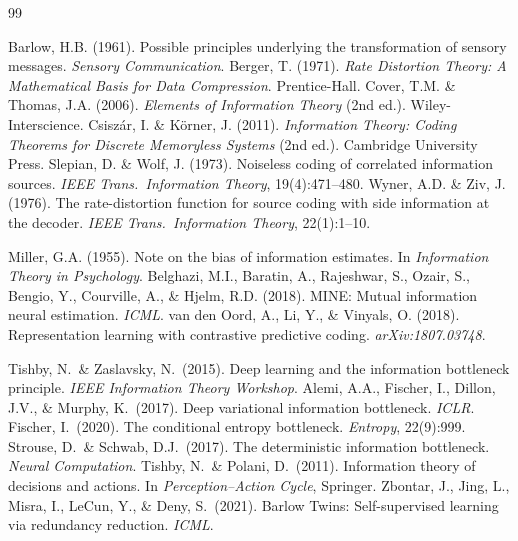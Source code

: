 \documentclass[10pt, letterpaper]{article}
\begin{document}
\begin{thebibliography}{99}

 Barlow, H.B. (1961). Possible principles underlying the transformation of sensory messages. \emph{Sensory Communication}.
 Berger, T. (1971). \emph{Rate Distortion Theory: A Mathematical Basis for Data Compression}. Prentice-Hall.
 Cover, T.M. \& Thomas, J.A. (2006). \emph{Elements of Information Theory} (2nd ed.). Wiley-Interscience.
 Csisz\'ar, I. \& K\"orner, J. (2011). \emph{Information Theory: Coding Theorems for Discrete Memoryless Systems} (2nd ed.). Cambridge University Press.
 Slepian, D. \& Wolf, J. (1973). Noiseless coding of correlated information sources. \emph{IEEE Trans.\ Information Theory}, 19(4):471--480.
 Wyner, A.D. \& Ziv, J. (1976). The rate-distortion function for source coding with side information at the decoder. \emph{IEEE Trans.\ Information Theory}, 22(1):1--10.

 Miller, G.A. (1955). Note on the bias of information estimates. In \emph{Information Theory in Psychology}.
 Belghazi, M.I., Baratin, A., Rajeshwar, S., Ozair, S., Bengio, Y., Courville, A., \& Hjelm, R.D. (2018). MINE: Mutual information neural estimation. \emph{ICML}.
 van den Oord, A., Li, Y., \& Vinyals, O. (2018). Representation learning with contrastive predictive coding. \emph{arXiv:1807.03748}.

 Tishby, N.\ \& Zaslavsky, N.\ (2015). Deep learning and the information bottleneck principle. \emph{IEEE Information Theory Workshop}.
 Alemi, A.A., Fischer, I., Dillon, J.V., \& Murphy, K.\ (2017). Deep variational information bottleneck. \emph{ICLR}.
 Fischer, I.\ (2020). The conditional entropy bottleneck. \emph{Entropy}, 22(9):999.
 Strouse, D.\ \& Schwab, D.J.\ (2017). The deterministic information bottleneck. \emph{Neural Computation}.
 Tishby, N.\ \& Polani, D.\ (2011). Information theory of decisions and actions. In \emph{Perception--Action Cycle}, Springer.
 Zbontar, J., Jing, L., Misra, I., LeCun, Y., \& Deny, S.\ (2021). Barlow Twins: Self-supervised learning via redundancy reduction. \emph{ICML}.


\end{thebibliography}
\end{document}
